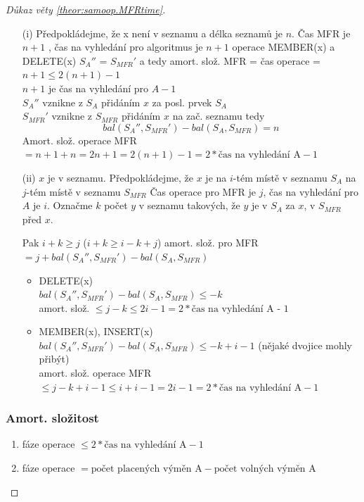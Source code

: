 \begin{proof}[Důkaz věty \ref{theor:samoop.MFRtime}]
\begin{itemize}
\item[(i)]
Předpokládejme, že x není v seznamu a délka seznamů je $n$.
Čas MFR je $n+1$ , čas na vyhledání pro algoritmus je $n+1$
operace MEMBER(x) a DELETE(x) $S_A''$ = $S_{MFR}'$
a tedy amort. slož. MFR = čas operace = $n+1 \leq 2(n+1) - 1$ \\
$n+1$ je čas na vyhledání pro $A - 1$ \\
$S_A''$ vznikne z $S_A$ přidáním $x$ za posl. prvek $S_A$ \\
$S_{MFR}'$ vznikne z $S_{MFR}$ přidáním $x$ na zač. seznamu
tedy 
$$
bal(S_A'', S_{MFR}') - bal(S_A, S_{MFR}) = n
$$
Amort. slož. operace MFR 
$= n+1 + n=2n + 1=2(n+1) - 1 = 2*\text{čas na vyhledání A} - 1$

\item[(ii)] $x$ je v seznamu. Předpokládejme, že $x$ je na $i$-tém místě v
seznamu $S_A$ na $j$-tém místě v seznamu $S_{MFR}$
Čas operace pro MFR je $j$, čas na vyhledání pro $A$ je $i$.
Označme $k$ počet $y$ v seznamu takových, že $y$ je v $S_A$ za $x$, v
$S_{MFR}$ před $x$.
\par
Pak $i+k \geq j$ ($i+k \geq i-k+j$)
amort. slož. pro MFR 
$= j + bal(S_A'', S_{MFR}') - bal(S_A, S_{MFR})$
\par

\begin{itemize}
  \item DELETE(x)\\
  $bal(S_A'', S_{MFR}') - bal(S_A, S_{MFR}) \leq -k$ \\
  amort. slož. $\leq j - k \leq 2i - 1 = 2*\text{čas na vyhledání A - 1}$
  
  \item MEMBER(x), INSERT(x) \\
  $bal(S_A'', S_{MFR}') - bal(S_A, S_{MFR}) \leq -k + i-1$
  (nějaké dvojice mohly přibýt) \\
  amort. slož. operace MFR 
  $\leq j-k+i-1 \leq i+i-1 = 2i - 1 = 2*\text{čas na vyhledání A} - 1$
\end{itemize}
\end{itemize}


\subsubsection{Amort. složitost}

\begin{enumerate}
\item fáze operace $\leq 2*\text{čas na vyhledání A} - 1$
\item fáze operace 
	$= \text{počet placených výměn A} - 
	\text{počet volných výměn A}$
\end{enumerate}


\end{proof}
